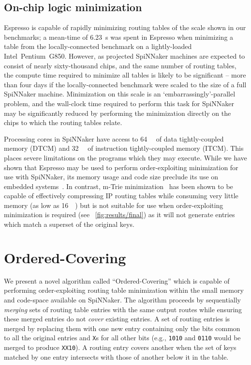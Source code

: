 \documentclass[conference]{IEEEtran}
\newcommand{\mytt}[1]{\texttt{\footnotesize#1}}
\begin{document}
\subsection*{On-chip logic minimization}

Espresso is capable of rapidly minimizing routing tables of the scale shown in our benchmarks; a mean-time of \SI{6.23}{\second} was spent in Espresso when minimizing a table from the locally-connected benchmark on a lightly-loaded Intel~Pentium~G850.
However, as projected SpiNNaker machines are expected to consist of nearly sixty-thousand chips, and the same number of routing tables, the  compute time required to minimize all tables is likely to be significant -- more than four days if the locally-connected benchmark were scaled to the size of a full SpiNNaker machine.
Minimization on this scale is an `embarrassingly'-parallel problem, and the wall-clock time required to perform this task for SpiNNaker may be significantly reduced by performing the minimization directly on the chips to which the routing tables relate.

Processing cores in SpiNNaker have access to \SI{64}{\kibi\byte} of data tightly-coupled memory (DTCM) and \SI{32}{\kibi\byte} of instruction tightly-coupled memory (ITCM).
This places severe limitations on the programs which they may execute.
While we have shown that Espresso may be used to perform order-exploiting minimization for use with SpiNNaker, its memory usage and code size preclude its use on embedded systems~\parencite{Lysecky2003}.
In contrast, m-Trie minimization~\parencite{Ahmad2007} has been shown to be capable of effectively compressing IP routing tables while consuming very little memory (as low as \SI{16}{\kibi\byte}) but is not suitable for use when order-exploiting minimization is required (see \figurename~\ref{fig:results/final}) as it will not generate entries which match a superset of the original keys.

\section{Ordered-Covering}

  We present a novel algorithm called ``Ordered-Covering'' which is capable of performing order-exploiting routing table minimization within the small memory and code-space available on SpiNNaker.
  The algorithm proceeds by sequentially \textit{merging} sets of routing table entries with the same output routes while ensuring these merged entries do not \textit{cover} existing entries. 
  A set of routing entries is merged by replacing them with one new entry containing only the bits common to all the original entries and \mytt{X}s for all other bits
  (e.g., \mytt{1010} and \mytt{0110} would be merged to produce \mytt{XX10}).
  A routing entry covers another when the set of keys matched by one entry intersects with those of another below it in the table.
\end{document}
